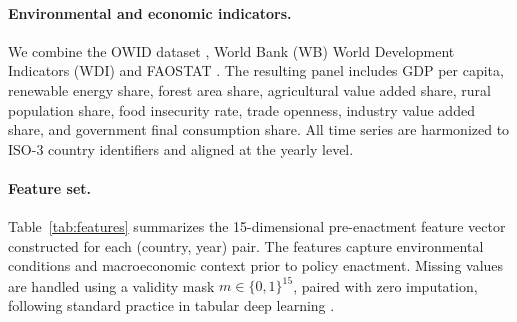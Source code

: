 \documentclass[11pt]{article}
\begin{document}
\paragraph{Environmental and economic indicators.}
We combine the OWID dataset \citep{owid-co2},  World Bank (WB) World Development Indicators (WDI) \citep{worldbank} and FAOSTAT \citep{faostat}. The resulting panel includes GDP per capita, renewable energy share, forest area share, agricultural value added share, rural population share, food insecurity rate, trade openness, industry value added share, and government final consumption share. All time series are harmonized to ISO-3 country identifiers and aligned at the yearly level.

\paragraph{Feature set.}
Table~\ref{tab:features} summarizes the 15-dimensional pre-enactment feature vector constructed for each (country, year) pair. The features capture environmental conditions and macroeconomic context prior to policy enactment. Missing values are handled using a validity mask $m \in \{0,1\}^{15}$, paired with zero imputation, following standard practice in tabular deep learning \citep{van2023missing}.


\begin{table}[!t]
\centering\small
\setlength{\tabcolsep}{3pt}
\caption{Pre-enactment feature set used for each (country, year) observation.}
\label{tab:features}
\end{table}
\end{document}
